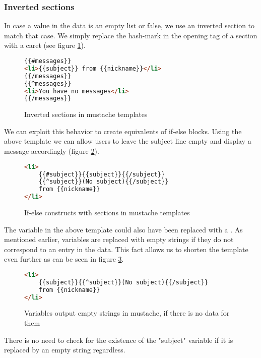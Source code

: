 \subsubsection{Inverted sections}
In case a value in the data is an empty list or false, we use an inverted
section to match that case. We simply replace the hash-mark in the opening tag
of a section with a caret (see figure \ref{fig:inverted.mustache}).
\begin{figure}
	\centering
	\caption{Inverted sections in mustache templates}
	\label{fig:inverted.mustache}
	\begin{lstlisting}[language=HTML]
{{#messages}}
<li>{{subject}} from {{nickname}}</li>
{{/messages}}
{{^messages}}
<li>You have no messages</li>
{{/messages}}
	\end{lstlisting}
\end{figure}

We can exploit this behavior to create equivalents of if-else blocks.
Using the above template we can allow users to leave the subject line empty
and display a message accordingly (figure \ref{fig:ifelse.mustache}).
\begin{figure}
	\centering
	\caption{If-else constructs with sections in mustache templates}
	\label{fig:ifelse.mustache}
	\begin{lstlisting}[language=HTML]
<li>
	{{#subject}}{{subject}}{{/subject}}
	{{^subject}}(No subject){{/subject}}
	from {{nickname}}
</li>
	\end{lstlisting}
\end{figure}

The  variable in the above template could also have been
replaced with a . As mentioned earlier, variables are replaced
with empty strings if they do not correspond to an entry in the data.
This fact allows us to shorten the template even further as can be seen in
figure \ref{fig:emptystr.mustache}.
\begin{figure}
	\centering
	\caption{Variables output empty strings in mustache, if there is no data for them}
	\label{fig:emptystr.mustache}
	\begin{lstlisting}[language=HTML]
<li>
	{{subject}}{{^subject}}(No subject){{/subject}}
	from {{nickname}}
</li>
	\end{lstlisting}
\end{figure}

There is no need to check for the existence of the "subject" variable if it is
replaced by an empty string regardless.


